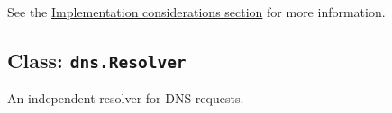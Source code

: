 \begin{Shaded}
\begin{Highlighting}[]
\OperatorTok{=} \NormalTok{(}\NormalTok{)}\OperatorTok{;}

\NormalTok{(}\OperatorTok{,}\OperatorTok{,}\KeywordTok{=\textgreater{}}\NormalTok{ \{}
  \OperatorTok{;}

  \NormalTok{(}\SpecialCharTok{$\{}\SpecialCharTok{\}}\VerbatimStringTok{\textasciigrave{}}\NormalTok{)}\OperatorTok{;}

\KeywordTok{=\textgreater{}}\NormalTok{ \{}
\OperatorTok{,}\OperatorTok{,}\KeywordTok{=\textgreater{}}\NormalTok{ \{}
        \OperatorTok{;}
\NormalTok{      \}}
      \NormalTok{(}\SpecialCharTok{$\{}\SpecialCharTok{\}}\VerbatimStringTok{: }\SpecialCharTok{$\{}\SpecialCharTok{\}}\VerbatimStringTok{\textasciigrave{}}\NormalTok{)}\OperatorTok{;}
\NormalTok{    \})}\OperatorTok{;}
\NormalTok{  \})}\OperatorTok{;}
\NormalTok{\})}\OperatorTok{;}
\end{Highlighting}
\end{Shaded}

See the \hyperref[implementation-considerations]{Implementation
considerations section} for more information.

\subsection{\texorpdfstring{Class:
\texttt{dns.Resolver}}{Class: dns.Resolver}}\label{class-dns.resolver}

An independent resolver for DNS requests.

